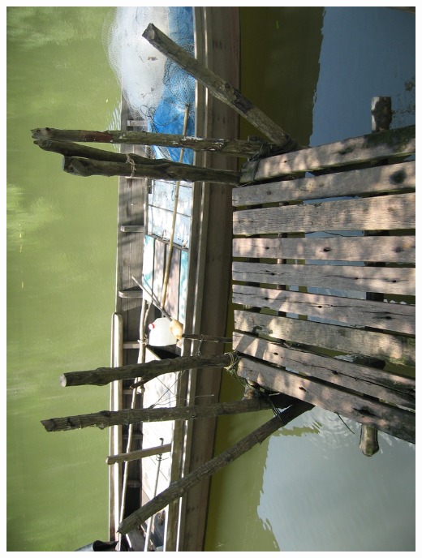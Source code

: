 \newpage\vspace*{-5cm}
\thispagestyle{empty}
\hspace*{-4cm}
\includegraphics[width=15.9cm]{articles/pagesCentrales/IMG_1276.JPG}

